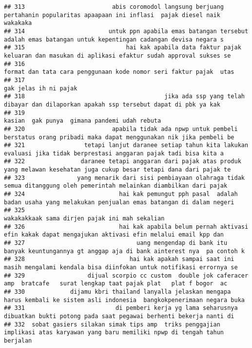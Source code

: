\documentclass[
]{article}
\begin{document}
\begin{verbatim}
## 313                         abis coromodol langsung berjuang pertahanin popularitas apaapaan ini inflasi  pajak diesel naik wakakaka
## 314                        untuk ppn apabila emas batangan tersebut adalah emas batangan untuk kepentingan cadangan devisa negara s 
## 315                             hai kak apabila data faktur pajak keluaran dan masukan di aplikasi efaktur sudah approval sukses se 
## 316                                                              format dan tata cara penggunaan kode nomor seri faktur pajak  utas 
## 317                                                                                                            gak jelas ih ni pajak
## 318                                        jika ada ssp yang telah dibayar dan dilaporkan apakah ssp tersebut dapat di pbk ya kak   
## 319                                                                                   kasian  gak punya  gimana pandemi udah rebuta 
## 320                         apabila tidak ada npwp untuk pembeli berstatus orang pribadi maka dapat menggunakan nik jika pembeli be 
## 321                 tetapi lanjut daranee setiap tahun kita lakukan evaluasi jika tidak berprestasi anggaran pajak tadi bisa kita a 
## 322                daranee tetapi anggaran dari pajak atas produk yang melawan kesehatan juga cukup besar tetapi dana dari pajak te 
## 323               yang menarik dari sisi pembiayaan olahraga tidak semua ditanggung oleh pemerintah melainkan diambilkan dari pajak 
## 324                           hai kak pemungut pph pasal  adalah badan usaha yang melakukan penjualan emas batangan di dalam negeri 
## 325                                                                                   wakakakkaak sama dirjen pajak ini mah sekalian
## 326                           hai kak apabila belum pernah aktivasi efin kakak dapat mengajukan aktivasi efin melalui email kpp dan 
## 327                                uang mengendap di bank itu banyak keuntungannya gt anggap aja di bank ainterest nya  pa contoh k 
## 328                              hai kak apakah sampai saat ini masih mengalami kendala bisa diinfokan untuk notifikasi errornya se 
## 329                  dijual scorpio cc custom  double jok caferacer amp  bratcafe   surat lengkap taat pajak plat   plat f bogor  ac
## 330             dijamu kbri thailand lanyalla jelaskan mengapa harus kembali ke sistem asli indonesia  bangkokpenerimaan negara buka
## 331                          di pemberi kerja yg lama seharusnya dibuatkan bukti potong pada saat pegawai berhenti bekerja nanti di 
## 332  sobat gasiers silakan simak tips amp  triks penggajian implikasi atas karyawan yang baru memiliki npwp di tengah tahun berjalan

\end{verbatim}
\end{document}
